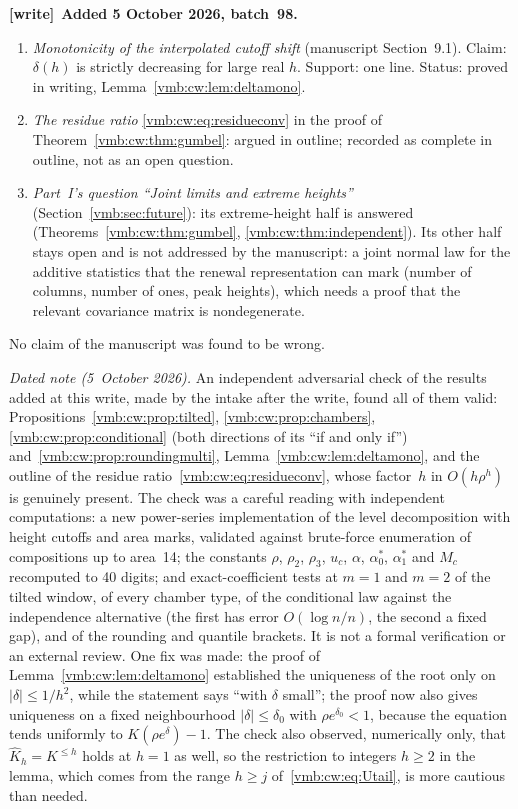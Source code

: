 \documentclass[11pt,a4paper]{article}
\numberwithin{equation}{section}
\theoremstyle{definition}\newtheorem{definition}[theorem]{Definition}
\theoremstyle{remark}\newtheorem{remark}[theorem]{Remark}
\newenvironment{writenote}[1][]{\par\smallskip\begingroup\small
 \noindent\textbf{[write]}\if\relax\detokenize{#1}\relax\else~\textbf{#1.}\fi\ }%
 {\par\endgroup\smallskip}
\begin{document}
\begin{writenote}[Added 5 October 2026, batch~98]
\begin{enumerate}[leftmargin=*,itemsep=2pt]
 Proposition~\ref{vmb:cw:prop:roundingmulti}.
\item \emph{Monotonicity of the interpolated cutoff shift} (manuscript
 Section~9.1). Claim: $\delta(h)$ is strictly decreasing for large real $h$.
 Support: one line. Status: proved in writing,
 Lemma~\ref{vmb:cw:lem:deltamono}.
\item \emph{The residue ratio} \eqref{vmb:cw:eq:residueconv} in the proof of
 Theorem~\ref{vmb:cw:thm:gumbel}: argued in outline; recorded as complete in
 outline, not as an open question.
\item \emph{Part~I's question ``Joint limits and extreme heights''}
 (Section~\ref{vmb:sec:future}): its extreme-height half is answered
 (Theorems~\ref{vmb:cw:thm:gumbel}, \ref{vmb:cw:thm:independent}). Its other
 half stays open and is not addressed by the manuscript: a joint normal law
 for the additive statistics that the renewal representation can mark (number
 of columns, number of ones, peak heights), which needs a proof that the
 relevant covariance matrix is nondegenerate.
\end{enumerate}
No claim of the manuscript was found to be wrong.

\emph{Dated note (5~October 2026).} An independent adversarial check of
the results added at this write, made by the intake after the write, found
all of them valid: Propositions~\ref{vmb:cw:prop:tilted},
\ref{vmb:cw:prop:chambers}, \ref{vmb:cw:prop:conditional} (both directions
of its ``if and only if'') and~\ref{vmb:cw:prop:roundingmulti},
Lemma~\ref{vmb:cw:lem:deltamono}, and the outline of the residue
ratio~\eqref{vmb:cw:eq:residueconv}, whose factor~$h$ in $O(h\rho^h)$ is
genuinely present. The check was a careful reading with independent
computations: a new power-series implementation of the level
decomposition with height cutoffs and area marks, validated against
brute-force enumeration of compositions up to area~14; the constants
$\rho$, $\rho_2$, $\rho_3$, $u_c$, $\alpha$, $\alpha_0^*$, $\alpha_1^*$ and
$M_c$ recomputed to 40 digits; and exact-coefficient tests at $m=1$ and
$m=2$ of the tilted window, of every chamber type, of the conditional
law against the independence alternative (the first has error
$O(\log n/n)$, the second a fixed gap), and of the rounding and quantile
brackets. It is not a formal verification or an external review. One fix
was made: the proof of Lemma~\ref{vmb:cw:lem:deltamono} established the
uniqueness of the root only on $|\delta|\le1/h^2$, while the statement says
``with $\delta$ small''; the proof now also gives uniqueness on a fixed
neighbourhood $|\delta|\le\delta_0$ with $\rho e^{\delta_0}<1$, because the
equation tends uniformly to $K(\rho e^\delta)-1$. The check also observed,
numerically only, that $\widehat K_h=K^{\le h}$ holds at $h=1$ as well, so the
restriction to integers $h\ge2$ in the lemma, which comes from the range
$h\ge j$ of~\eqref{vmb:cw:eq:Utail}, is more cautious than needed.
\end{writenote}
\end{document}

